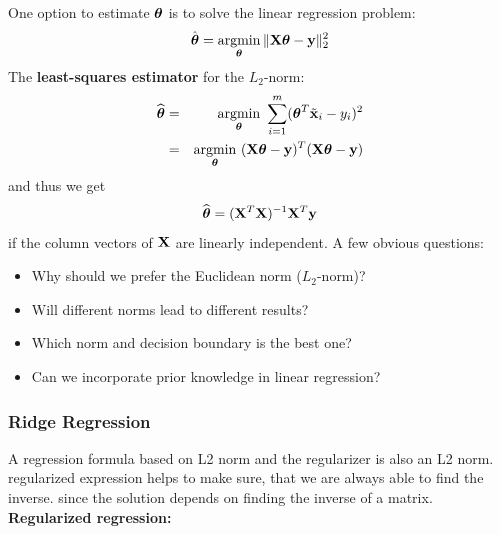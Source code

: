 		One option to estimate $\bm{\mathrm{\theta}}$ is to solve the linear regression problem:
	\begin{displaymath}
		\hat{\bm{\mathrm{\theta}}} = \operatorname*{argmin}_{\bm{\mathrm{\theta}}}\| \mathbf{X} \bm{\mathrm{\theta}} - \bm{\mathrm{y}}\|_{2}^2
	\end{displaymath}
The \textbf{least-squares estimator} for the $L_2$-norm:
	\begin{eqnarray*}
		\widehat{\vect \theta} &=& \argmin_{\vect\theta} \ \sum_{i=1}^m (\vect \theta^T\tilde{\vect x}_i-y_i)^2\\
		&=& \argmin_{\vect\theta} \ (\mat{X}\vect \theta-\vect y)^T(\mat{X}\vect \theta-\vect y)
	\end{eqnarray*}
	and thus we get
	\begin{displaymath}
		\widehat{\bm{\mathrm{\theta}}} = (\mathbf{X}^T\mathbf{X})^{-1}\mathbf{X}^T\bm{\mathrm{y}}
	\end{displaymath}
	if the column vectors of $\mathbf{X}$ are linearly independent. A few obvious questions:
	\begin{itemize}
		\item Why should we prefer the Euclidean norm ($L_2$-norm)? 
		\item Will different norms lead to different results? 
		\item Which norm and decision boundary is the best one? 
		\item Can we incorporate prior knowledge in linear regression?
	\end{itemize}	

\subsubsection{Ridge Regression}

A regression formula based on L2 norm and the regularizer is also an L2 norm. regularized expression helps to make sure, that we are always able to find the inverse. since the solution depends on finding the inverse of a matrix. \\ 

\textbf{Regularized regression:}

